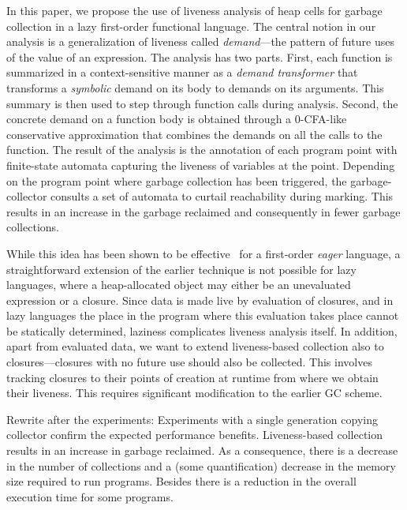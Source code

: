 \documentclass[9pt]{sigplanconf}
\begin{document}
In this paper,  we propose the use of liveness  analysis of heap cells
for garbage collection in a lazy first-order functional language.  The
central notion in our analysis  is a generalization of liveness called
{\em  demand}---the  pattern  of  future  uses  of  the  value  of  an
expression.   The analysis  has two  parts.  First,  each  function is
summarized in a context-sensitive manner as a {\em demand transformer}
that transforms a {\em symbolic} demand  on its body to demands on its
arguments.  This summary  is then used to step  through function calls
during analysis.   Second, the concrete  demand on a function  body is
obtained through a 0-CFA-like conservative approximation that combines
the  demands on  all the  calls to  the function.   The result  of the
analysis  is the annotation  of each  program point  with finite-state
automata capturing  the liveness of variables at  the point. Depending
on the program point where  garbage collection has been triggered, the
garbage-collector consults  a set of automata  to curtail reachability
during marking.  This results in  an increase in the garbage reclaimed
and consequently in fewer garbage collections.

While this idea has been shown to be effective~\cite{asati14lgc} for a
first-order {\em  eager} language, a straightforward  extension of the
earlier  technique  is  not  possible  for  lazy  languages,  where  a
heap-allocated  object may either  be an  unevaluated expression  or a
closure. Since  data is  made live by  evaluation of closures,  and in
lazy languages  the place in  the program where this  evaluation takes
place cannot  be statically determined,  laziness complicates liveness
analysis itself.  In  addition, apart from evaluated data,  we want to
extend  liveness-based collection also  to closures---closures with no
future use should also  be collected.  This involves tracking closures
to  their points of  creation at  runtime from  where we  obtain their
liveness.  This  requires significant  modification to the  earlier GC
scheme.

{\color  {Myblue}Rewrite after the experiments:  Experiments  with a
single
  generation  copying  collector   confirm  the  expected  performance
  benefits.   Liveness-based  collection  results  in an  increase  in
  garbage reclaimed.   As a  consequence, there is  a decrease  in the
  number of  collections and a  (some quantification) decrease  in the
  memory size required  to run programs. Besides there  is a reduction
  in the overall execution time for some programs.}
\end{document}
